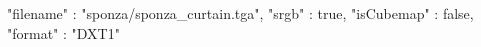 { 
	"filename" : "sponza/sponza_curtain.tga", 
	"srgb" : true,
	"isCubemap" : false,
	"format" : "DXT1"
}